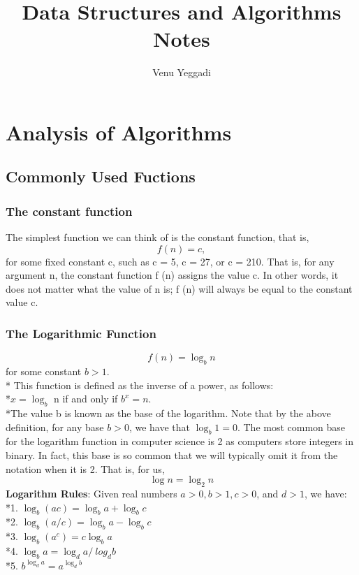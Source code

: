 \documentclass[12pt, a4paper, openany]{book}
\title{\textbf{Data Structures and Algorithms Notes}}
\author{Venu Yeggadi}
\begin{document}
\maketitle

\tableofcontents

\chapter{Analysis of Algorithms}

\section{Commonly Used Fuctions}

 \subsection{The constant function}
The simplest function we can think of is the constant function, that is,
\[f (n) = c,\]
for some fixed constant c, such as c = 5, c = 27, or c = 210. That is, for any argument n, the constant
function f (n)  assigns the value c. In other words, it does not matter what the value of n is; f (n) will 
always be equal to the constant value c.

\subsection{The Logarithmic Function}
\[f(n) = \log_b n\] 
for some constant \(b > 1\).
\\* This function is defined as the inverse of a power, as follows:
\\*\(x = \log_b\) n if and only if \(b^x = n\).
\\*The value b is known as the base of the logarithm. Note that by the above definition,
for any base \(b > 0\), we have that \(\log_b 1 = 0\).
The most common base for the logarithm function in computer science is 2 as computers store integers
in binary. In fact, this base is so common that we will typically omit it from the notation when it is 2. That is, for us,
\[\log n = \log_2 n\]
\textbf{Logarithm Rules}: Given real numbers \(a > 0, b > 1, c > 0\),
and \(d > 1\), we have:
\\*1. \(\log_b(ac) = \log_b a+ \log_b c\)
\\*2. \(\log_b(a/c) = \log_b a -\log_b c\)
\\*3. \(\log_b(a^c) = c\log_b a\)
\\*4. \(\log_b a = \log_d a /\ log_d b\)
\\*5. \(b^{\log_d a} = a^{\log_d b}\)
\end{document}
